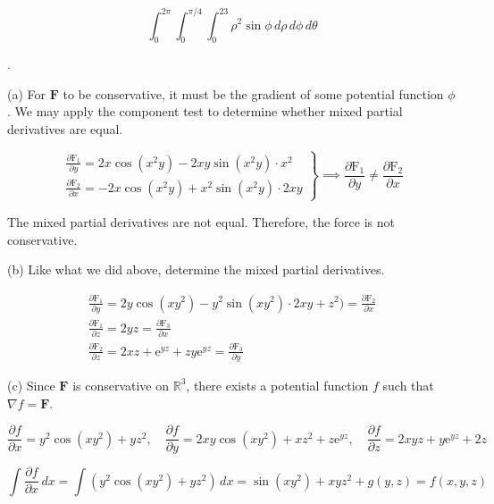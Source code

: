 \documentclass{article}
\begin{document}
\[\boxed{\int_0^{2\pi}\int_{0}^{\pi/4}\int_0^23\rho^2\sin\phi\,d\rho\,d\phi\,d\theta}\]

\hfill

.

\hfill

\noindent (a) For $\mathbf{F}$ to be conservative, it must be the gradient of some potential function $\phi$. We may apply the component test to determine whether mixed partial derivatives are equal.

\hfill

\[
\left.
\begin{array}{l}
\displaystyle\frac{\partial\mathrm{F}_1}{\partial y}=2x\cos\left(x^2y\right)-2xy\sin\left(x^2y\right)\cdot x^2\\[1em]
\displaystyle\frac{\partial\mathrm{F}_2}{\partial x}=-2x\cos\left(x^2y\right)+x^2\sin\left(x^2y\right)\cdot 2xy
\end{array}\right\}\implies\displaystyle\frac{\partial\mathrm{F}_1}{\partial y}\neq\displaystyle\frac{\partial\mathrm{F}_2}{\partial x}
\]

\hfill

\noindent The mixed partial derivatives are not equal. Therefore, the force is not conservative.

\hfill

\noindent (b) Like what we did above, determine the mixed partial derivatives.

\[
\begin{array}{c}
\displaystyle\frac{\partial\mathrm{F}_1}{\partial y}=2y\cos\left(xy^2\right)-y^2\sin\left(xy^2\right)\cdot2xy+z^2)=\frac{\partial\mathrm{F}_2}{\partial x}\\[1em]
\displaystyle\frac{\partial\mathrm{F}_1}{\partial z}=2yz=\frac{\partial\mathrm{F}_3}{\partial x}\\[1em]
\displaystyle\frac{\partial\mathrm{F}_2}{\partial z}=2xz+\mathrm{e}^{yz}+zy\mathrm{e}^{yz}=\frac{\partial\mathrm{F}_3}{\partial y}
\end{array}
\]

\hfill

\noindent (c) Since $\mathbf{F}$ is conservative on $\mathbb{R}^3$, there exists a potential function $f$ such that $\nabla f=\mathbf{F}$.

\[\frac{\partial f}{\partial x}=y^2\cos\left(xy^2\right)+yz^2,\quad\frac{\partial f}{\partial y}=2xy\cos\left(xy^2\right)+xz^2+z\mathrm{e}^{yz},\quad\frac{\partial f}{\partial z}=2xyz+y\mathrm{e}^{yz}+2z\]

\[\int\frac{\partial f}{\partial x}\,dx=\int\left(y^2\cos\left(xy^2\right)+yz^2\right)\,dx=\sin\left(xy^2\right)+xyz^2+g(y,z)=f(x,y,z)\]
\end{document}
